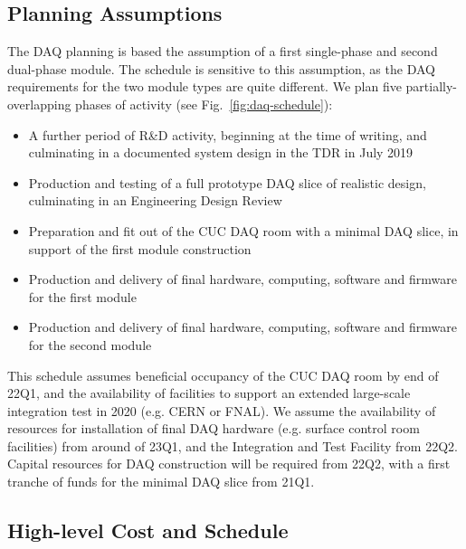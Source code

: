 \subsection{Planning Assumptions}
\label{sec:fd-daq-org-assmp}

The DAQ planning is based the assumption of a first single-phase and second dual-phase module. The schedule is sensitive to this assumption, as the DAQ requirements for the two module types are quite different. We plan five partially-overlapping phases of activity (see Fig.~\ref{fig:daq-schedule}):

\begin{itemize}
	\item A further period of R\&D activity, beginning at the time of writing, and culminating in a documented system design in the TDR in July 2019
	\item Production and testing of a full prototype DAQ slice of realistic design, culminating in an Engineering Design Review
	\item Preparation and fit out of the CUC DAQ room with a minimal DAQ slice, in support of the first module construction
	\item Production and delivery of final hardware, computing, software and firmware for the first module
	\item Production and delivery of final hardware, computing, software and firmware for the second module
\end{itemize}

This schedule assumes beneficial occupancy of the CUC DAQ room by end of 22Q1, and the availability of facilities to support an extended large-scale integration test in 2020 (e.g. CERN or FNAL). We assume the availability of resources for installation of final DAQ hardware (e.g. surface control room facilities) from around of 23Q1, and the Integration and Test Facility from 22Q2. Capital resources for DAQ construction will be required from 22Q2, with a first tranche of funds for the minimal DAQ slice from 21Q1.



\subsection{High-level Cost and Schedule}
\label{sec:fd-daq-org-cs}

